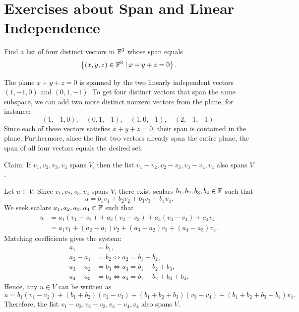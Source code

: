 \section*{Exercises about Span and Linear Independence}

\begin{xrcs}
  Find a list of four distinct vectors in $\mathbb{F}^3$ whose span equals
  \begin{equation}
    \left \{  \left(x,y,z \right) \in \mathbb{F}^3 \mid x + y + z = 0 \right \}.
  \end{equation}

  \begin{xsol}
    The plane $x+y+z=0$ is spanned by the two linearly independent vectors $(1,-1,0)$ and $(0,1,-1)$. To get four distinct vectors that span the same subspace, we can add two more distinct nonzero vectors from the plane, for instance:
    \begin{equation}
      (1,-1,0), \quad (0,1,-1), \quad (1,0,-1), \quad (2,-1,-1).
    \end{equation}
    Since each of these vectors satisfies $x+y+z=0$, their span is contained in the plane. Furthermore, since the first two vectors already span the entire plane, the span of all four vectors equals the desired set.
  \end{xsol}
\end{xrcs}

\begin{xrcs}
  Claim: If $v_1, v_2, v_3, v_4$ spans $V$, then the list $v_1 - v_2, v_2 - v_3, v_3 - v_4, v_4$ also spans $V$.

  \begin{xprf}
    Let $u \in V$. Since $v_1, v_2, v_3, v_4$ spans $V$, there exist scalars $b_1, b_2, b_3, b_4 \in \mathbb{F}$ such that
    \[
      u = b_1 v_1 + b_2 v_2 + b_3 v_3 + b_4 v_4.
    \]
    We seek scalars $a_1, a_2, a_3, a_4 \in \mathbb{F}$ such that
    \[
    \begin{aligned}
      u &= a_1 (v_1 - v_2) + a_2 (v_2 - v_3) + a_3 (v_3 - v_4) + a_4 v_4 \\
        &= a_1 v_1 + (a_2 - a_1) v_2 + (a_3 - a_2) v_3 + (a_4 - a_3) v_4.
    \end{aligned}
    \]
    Matching coefficients gives the system:
    \[
    \begin{aligned}
      a_1 &= b_1, \\
      a_2 - a_1 &= b_2 \iff a_2 = b_1 + b_2, \\
      a_3 - a_2 &= b_3 \iff a_3 = b_1 + b_2 + b_3, \\
      a_4 - a_3 &= b_4 \iff a_4 = b_1 + b_2 + b_3 + b_4.
    \end{aligned}
    \]
    Hence, any $u \in V$ can be written as
    \[
      u = b_1 (v_1 - v_2) + (b_1+b_2)(v_2 - v_3) + (b_1+b_2+b_3)(v_3 - v_4) + (b_1+b_2+b_3+b_4) v_4.
    \]
    Therefore, the list $v_1 - v_2, v_2 - v_3, v_3 - v_4, v_4$ also spans $V$.
  \end{xprf}
\end{xrcs}

